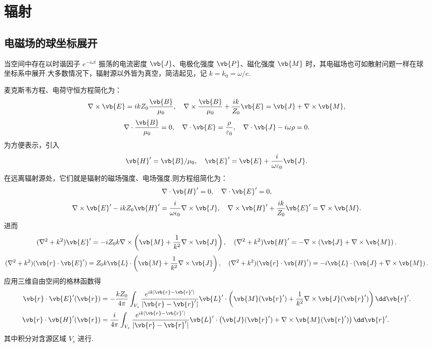 
\chapter{辐射}

\section{电磁场的球坐标展开}

当空间中存在以时谐因子 \(e^{-i\omega t}\) 振荡的电流密度 \(\vb{J}\)、电极化强度 \(\vb{P}\)、磁化强度 \(\vb{M}\) 时，其电磁场也可如散射问题一样在球坐标系中展开.大多数情况下，辐射源以外皆为真空，简洁起见，记 \(k = k_0 = \omega/c\).

麦克斯韦方程、电荷守恒方程简化为：
\begin{align*}
	\nabla \times \vb{E} = i k Z_0 \frac{\vb{B}}{\mu_0}, \quad
	\nabla \times \frac{\vb{B}}{\mu_0} + \frac{i k}{Z_0} \vb{E} = \vb{J} + \nabla \times \vb{M} ,
\end{align*}
\begin{align*}
	\nabla \cdot \frac{\vb{B}}{\mu_0} = 0, \quad \nabla \cdot \vb{E} = \frac{\rho}{\varepsilon_0}, \quad
	\nabla \cdot \vb{J} - i \omega \rho = 0.
\end{align*}
为方便表示，引入
\begin{align*}
	\vb{H}' = \vb{B}/\mu_0, \quad
	\vb{E}' = \vb{E} + \frac{i}{\omega \varepsilon_0} \vb{J}.
\end{align*}
在远离辐射源处，它们就是辐射的磁场强度、电场强度.则方程组简化为：
\begin{align*}
	\nabla \cdot \vb{H}' = 0, \quad \nabla \cdot \vb{E}' = 0,
\end{align*}
\begin{align*}
	\nabla \times \vb{E}' - i k Z_0 \vb{H}' = \frac{i}{\omega \epsilon_0} \nabla \times \vb{J}, \quad
	\nabla \times \vb{H}' + \frac{i k}{Z_0} \vb{E}' = \nabla \times \vb{M} .
\end{align*}
进而
\begin{align*}
	(\nabla^2 + k^2) \vb{E}' = -i Z_0 k \nabla \times \left( \vb{M} + \frac{1}{k^2} \nabla \times \vb{J} \right),\quad
	(\nabla^2 + k^2) \vb{H}' = -\nabla \times \left( \vb{J} + \nabla \times \vb{M} \right).
\end{align*}
\begin{align*}
	(\nabla^2 + k^2)(\vb{r} \cdot \vb{E}') = Z_0 k \vb{L} \cdot \left( \vb{M} + \frac{1}{k^2} \nabla \times \vb{J} \right),\quad
	(\nabla^2 + k^2)(\vb{r} \cdot \vb{H}') = -i \vb{L} \cdot \left( \vb{J} + \nabla \times \vb{M} \right).
\end{align*}
应用三维自由空间的格林函数得
\begin{align*}
	\vb{r} \cdot \vb{E}'(\vb{r}) &= -\frac{k Z_0}{4 \pi} \int_{V_s} \frac{e^{i k |\vb{r} - \vb{r}'|}}{|\vb{r} - \vb{r}'|} \vb{L}' \cdot \left( \vb{M}(\vb{r}') + \frac{1}{k^2} \nabla \times \vb{J}(\vb{r}') \right) \dd \vb{r}'.\\
	\vb{r} \cdot \vb{H}'(\vb{r}) &= \frac{i}{4 \pi} \int_{V_s} \frac{e^{i k |\vb{r} - \vb{r}'|}}{|\vb{r} - \vb{r}'|} \vb{L}' \cdot \left( \vb{J}(\vb{r}') + \nabla \times \vb{M}(\vb{r}') \right) \dd \vb{r}'.
\end{align*}
其中积分对含源区域 \(V_s\) 进行.


